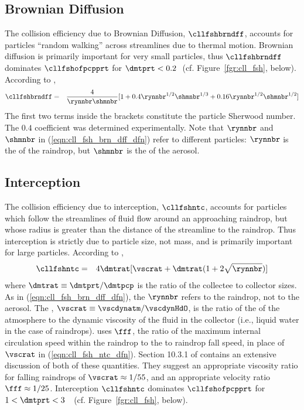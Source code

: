 \documentclass[12pt,twoside]{book}
\begin{document}
\subsection[Brownian Diffusion]{Brownian Diffusion}\label{sxn:dff_brn}
The collision efficiency due to Brownian Diffusion, $\cllfshbrndff$,
accounts for particles ``random walking'' across streamlines due to
thermal motion.   
Brownian diffusion is primarily important for very small particles,
thus $\cllfshbrndff$ dominates $\cllfshofpcpprt$ for 
$\dmtprt < 0.2$\,\um\ (cf. Figure~\ref{fgr:cll_fsh}, below).
According to \cite{Sli84},
\begin{eqnarray}
\cllfshbrndff & = & \frac{4}{\rynnbr \shmnbr } 
[ 1 + 0.4 \rynnbr^{1/2} \shmnbr^{1/3} + 0.16 \rynnbr^{1/2} \shmnbr^{1/2} ]
\label{eqn:cll_fsh_brn_dff_dfn}
\end{eqnarray}
The first two terms inside the brackets constitute the particle
Sherwood number. 
The $0.4$ coefficient was determined experimentally. 
Note that $\rynnbr$ and $\shmnbr$ in (\ref{eqn:cll_fsh_brn_dff_dfn})
refer to different particles: $\rynnbr$ is the  of the raindrop, but $\shmnbr$ is the  
of the aerosol.

\subsection[Interception]{Interception}\label{sxn:ntc}
The collision efficiency due to interception, $\cllfshntc$,
accounts for particles which follow the streamlines of fluid flow
around an approaching raindrop, but whose radius is greater than
the distance of the streamline to the raindrop.
Thus interception is strictly due to particle size, not mass, 
and is primarily important for large particles.
According to \cite{Sli84},
\begin{eqnarray}
\cllfshntc & = & 4 \dmtrat [ \vscrat + 
\dmtrat ( 1 + 2 \sqrt{\rynnbr} ) ]
\label{eqn:cll_fsh_ntc_dfn}
\end{eqnarray}
where $\dmtrat \equiv \dmtprt / \dmtpcp $ is the ratio of the
collectee to collector sizes.
As in (\ref{eqn:cll_fsh_brn_dff_dfn}), the $\rynnbr$ refers to the
raindrop, not to the aerosol.
The , 
$\vscrat \equiv \vscdynatm / \vscdynHdO$,
is the ratio of the  of the atmosphere to
the dynamic viscosity of the fluid in the collector (i.e., liquid
water in the case of raindrops). 
\cite{Sli82} uses $\fff$, the ratio of the maximum internal
circulation speed within the raindrop to the to raindrop fall speed,
in place of $\vscrat$ in (\ref{eqn:cll_fsh_ntc_dfn}).
Section 10.3.1 of \cite{PrK98} contains an extensive discussion of
both of these quantities.
They suggest an appropriate viscosity ratio for falling raindrops of
$\vscrat \approx 1/55$, and an appropriate velocity ratio $\fff
\approx 1/25$.
Interception $\cllfshntc$ dominates $\cllfshofpcpprt$ for 
$1 < \dmtprt < 3$\,\um\ \cite[]{NGD94} 
(cf. Figure~\ref{fgr:cll_fsh}, below).
\end{document}
